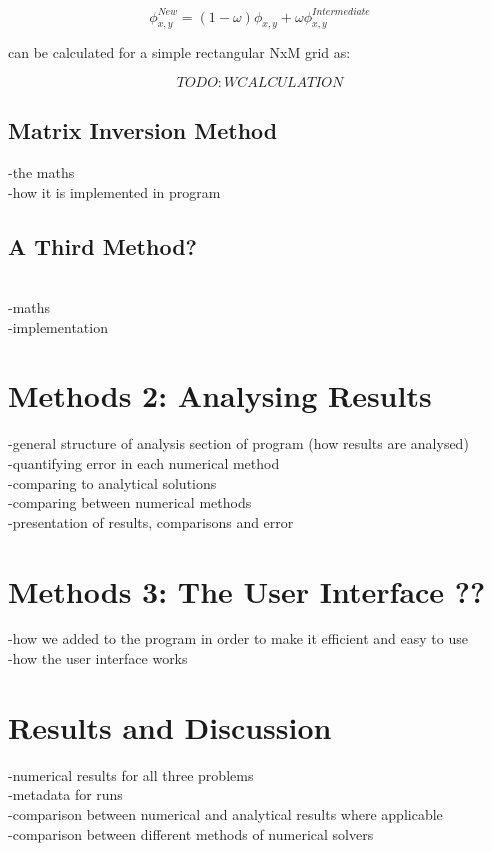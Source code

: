 \documentclass{article}
\begin{document}
\begin{equation}
\phi_{x,y}^{New} = (1-\omega)\phi_{x,y}+\omega\phi_{x,y}^{Intermediate}
\label{eq:sor}
\end{equation}

\omega\) can be calculated for a simple rectangular NxM grid as: 

\begin{equation}

\label{eq:q}
TODO: W CALCULATION
\end{equation}



\subsection{Matrix Inversion Method}
-the maths \\
-how it is implemented in program \\

\subsection{A Third Method?} \\
-maths \\
-implementation \\



\section{Methods 2: Analysing Results}
-general structure of analysis section of program (how results are analysed) \\
-quantifying error in each numerical method \\
-comparing to analytical solutions \\
-comparing between numerical methods \\
-presentation of  results, comparisons and error \\

\section{Methods 3: The User Interface ??}
-how we added to the program in order to make it efficient and easy to use \\
-how the user interface works \\


\section{Results and Discussion}
-numerical results for all three problems\\
-metadata for runs \\
-comparison between numerical and analytical results where applicable\\
-comparison between different methods of numerical solvers\\
\end{document}

